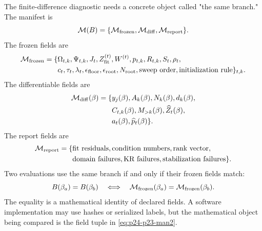 \documentclass[11pt]{article}
\numberwithin{equation}{section}
\begin{document}
The finite-difference diagnostic needs a concrete object called "the same
branch."  The manifest is
\begin{equation}
    \mathcal M(B)
    =
    \{\mathcal M_{\rm frozen},\mathcal M_{\rm diff},\mathcal M_{\rm report}\}.
    \label{eq:p24-p23-man1}
\end{equation}
The frozen fields are
\begin{equation}
\begin{aligned}
    \mathcal M_{\rm frozen}
    =
    \{&
    \Omega_{t,k},\Psi_{t,k},J_t,
    Z_{\rm fit}^{(t)},W^{(t)},p_{t,k},R_{t,k},
    S_t,\rho_t,\\
    &c_t,\tau_t,\lambda_t,\epsilon_{\rm floor},
    \epsilon_{\rm root},N_{\rm root},
    \text{sweep order},\text{initialization rule}\}_{t,k}.
\end{aligned}
    \label{eq:p24-p23-man2}
\end{equation}
The differentiable fields are
\begin{equation}
    \begin{aligned}
    \mathcal M_{\rm diff}(\beta)
    =
    \{&
    y_j(\beta),A_k(\beta),N_k(\beta),d_k(\beta),\\
    &C_{t,k}(\beta),M_{>k}(\beta),\widehat Z_t(\beta),\\
    &a_t(\beta),\widehat p_t(\beta)\}.
    \end{aligned}
    \label{eq:p24-p23-man3}
\end{equation}
The report fields are
\begin{equation}
    \begin{aligned}
    \mathcal M_{\rm report}
    =
    \{&
    \text{fit residuals},\text{condition numbers},\text{rank vector},\\
    &\text{domain failures},\text{KR failures},
      \text{stabilization failures}\}.
    \end{aligned}
    \label{eq:p24-p23-man4}
\end{equation}
Two evaluations use the same branch if and only if their frozen fields match:
\begin{equation}
    B(\beta_a)=B(\beta_b)
    \quad\Longleftrightarrow\quad
    \mathcal M_{\rm frozen}(\beta_a)=\mathcal M_{\rm frozen}(\beta_b).
    \label{eq:p24-p23-man5}
\end{equation}
The equality is a mathematical identity of declared fields.  A software
implementation may use hashes or serialized labels, but the mathematical
object being compared is the field tuple in \eqref{eq:p24-p23-man2}.
\end{document}
